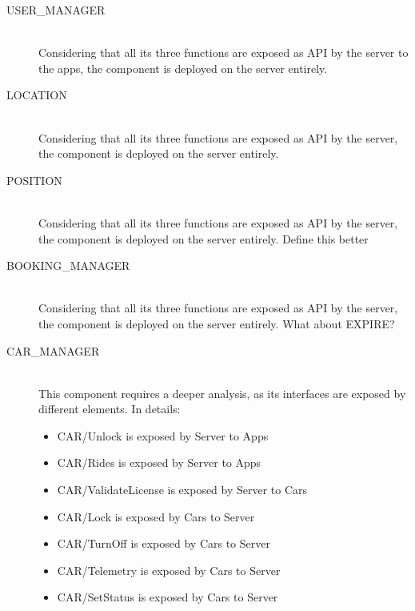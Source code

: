 \documentclass[11pt]{article} %
\begin{document}
\begin{description}
\begin{description}
	\item[USER\_MANAGER] \hfill \\
	Considering that all its three functions are exposed as API by the server to the apps, the component is deployed on the server entirely.
		
	\item[LOCATION] \hfill \\
	Considering that all its three functions are exposed as API by the server, the component is deployed on the server entirely.

	\item[POSITION] \hfill \\
	Considering that all its three functions are exposed as API by the server, the component is deployed on the server entirely. {\color{red} {Define this better}}
	
	\item[BOOKING\_MANAGER] \hfill \\
	Considering that all its three functions are exposed as API by the server, the component is deployed on the server entirely. {\color{red} {What about EXPIRE?}}
	
	\item[CAR\_MANAGER] \hfill \\
	This component requires a deeper analysis, as its interfaces are exposed by different elements. In details:
	\begin{itemize}
		\item CAR/Unlock is exposed by Server to Apps
		\item CAR/Rides is exposed by Server to Apps
		\item CAR/ValidateLicense is exposed by Server to Cars
		\item CAR/Lock is exposed by Cars to Server
		\item CAR/TurnOff is exposed by Cars to Server
		\item CAR/Telemetry is exposed by Cars to Server
		\item CAR/SetStatus is exposed by Cars to Server
	\end{itemize}
\end{description}
	

\end{description}
\end{document}
